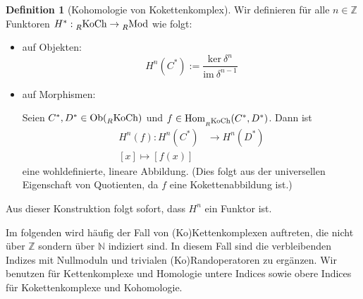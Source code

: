 \documentclass[a4paper,twoside,10pt]{scrreprt}
\newcommand{\Z}{\mathbb{Z}}
\newcommand{\N}{\mathbb{N}}
\theoremstyle{definition}
\newtheorem{definition}[satz]{Definition}
\begin{document}
\begin{definition}[Kohomologie von Kokettenkomplex]\label{def:DefCohomCochain}
Wir definieren für alle $n\in \Z$ Funktoren $H^*:\prescript{}{R}{\text{KoCh}}\to \prescript{}{R}{\text{Mod}}$ wie folgt:
\begin{itemize}
\item auf Objekten:
\begin{equation*}
H^n(C^*):=\frac{\text{ker}~\delta^n}{\text{im}~\delta^{n-1}}
\end{equation*}
\item auf Morphismen:\par
Seien $C^*,D^*\in \text{Ob}(\prescript{}{R}{\text{KoCh}})$ und $f\in \text{Hom}_{\prescript{}{R}{\text{KoCh}}}(C^*,D^*)$. Dann ist 
\begin{align*}
H^n(f):H^n(C^*)&\to H^n(D^*)\\
[x]\mapsto [f(x)]
\end{align*}
eine wohldefinierte, lineare Abbildung. (Dies folgt aus der universellen Eigenschaft von Quotienten, da $f$ eine Kokettenabbildung ist.)
\end{itemize}
Aus dieser Konstruktion folgt sofort, dass $H^n$ ein Funktor ist.
\end{definition}
Im folgenden wird häufig der Fall von (Ko)Kettenkomplexen auftreten, die nicht über $\Z$ sondern über $\N$ indiziert sind. In diesem Fall sind die verbleibenden Indizes mit Nullmoduln und trivialen (Ko)Randoperatoren zu ergänzen. Wir benutzen für Kettenkomplexe und Homologie untere Indices sowie obere Indices für Kokettenkomplexe und Kohomologie.
\end{document}
